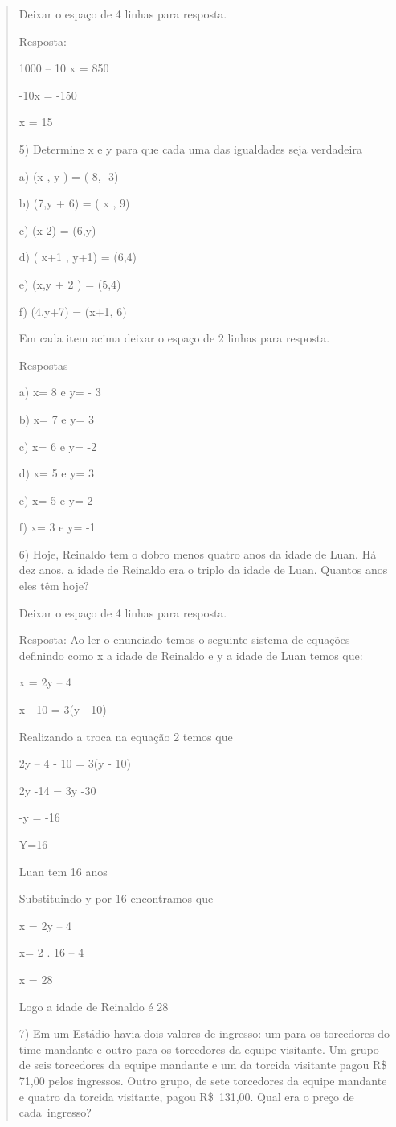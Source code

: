 \begin{quote}
\begin{escolha}
Deixar o espaço de 4 linhas para resposta.

Resposta:

1000 -- 10 x = 850

-10x = -150

x = 15

5) Determine x e y para que cada uma das igualdades seja verdadeira

a) (x , y ) = ( 8, -3)

b) (7,y + 6) = ( x , 9)

c) (x-2) = (6,y)

d) ( x+1 , y+1) = (6,4)

e) (x,y + 2 ) = (5,4)

f) (4,y+7) = (x+1, 6)

Em cada item acima deixar o espaço de 2 linhas para resposta.

Respostas

a) x= 8 e y= - 3

b) x= 7 e y= 3

c) x= 6 e y= -2

d) x= 5 e y= 3

e) x= 5 e y= 2

f) x= 3 e y= -1

6) Hoje, Reinaldo tem o dobro menos quatro anos da idade de Luan. Há dez
anos, a idade de Reinaldo era o triplo da idade de Luan. Quantos anos
eles têm hoje?

Deixar o espaço de 4 linhas para resposta.

Resposta: Ao ler o enunciado temos o seguinte sistema de equações
definindo como x a idade de Reinaldo e y a idade de Luan temos que:

x = 2y -- 4

x - 10 = 3(y - 10)

Realizando a troca na equação 2 temos que

2y -- 4 - 10 = 3(y - 10)

2y -14 = 3y -30

-y = -16

Y=16

Luan tem 16 anos

Substituindo y por 16 encontramos que

x = 2y -- 4

x= 2 . 16 -- 4

x = 28

Logo a idade de Reinaldo é 28

7) Em um Estádio havia dois valores de ingresso: um para os torcedores
do time mandante e outro para os torcedores da equipe visitante. Um
grupo de seis torcedores da equipe mandante e um da torcida visitante
pagou R\$ 71,00 pelos ingressos. Outro grupo, de sete torcedores da
equipe mandante e quatro da torcida visitante, pagou R\$~131,00. Qual
era o preço de cada~ingresso?


\end{escolha}
\end{quote}
